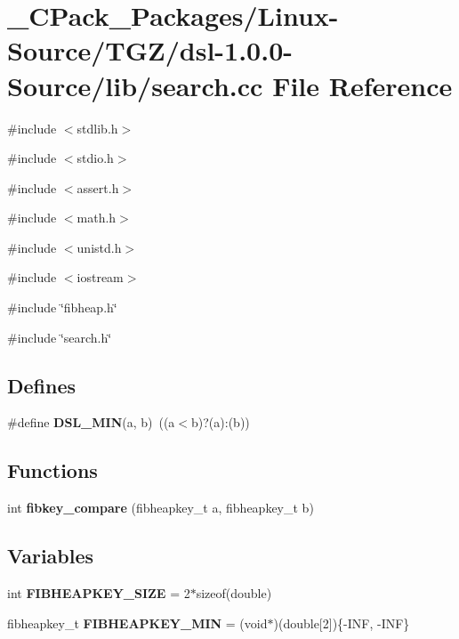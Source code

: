 \section{\_\-CPack\_\-Packages/Linux-\/Source/TGZ/dsl-\/1.0.0-\/Source/lib/search.cc File Reference}
\label{__CPack__Packages_2Linux-Source_2TGZ_2dsl-1_80_80-Source_2lib_2search_8cc}
{\ttfamily \#include $<$stdlib.h$>$}\par
{\ttfamily \#include $<$stdio.h$>$}\par
{\ttfamily \#include $<$assert.h$>$}\par
{\ttfamily \#include $<$math.h$>$}\par
{\ttfamily \#include $<$unistd.h$>$}\par
{\ttfamily \#include $<$iostream$>$}\par
{\ttfamily \#include \char`\"{}fibheap.h\char`\"{}}\par
{\ttfamily \#include \char`\"{}search.h\char`\"{}}\par
\subsection*{Defines}
\begin{DoxyCompactItemize}
\item 
\#define {\bf DSL\_\-MIN}(a, b)~((a$<$b)?(a):(b))
\end{DoxyCompactItemize}
\subsection*{Functions}
\begin{DoxyCompactItemize}
\item 
int {\bf fibkey\_\-compare} (fibheapkey\_\-t a, fibheapkey\_\-t b)
\end{DoxyCompactItemize}
\subsection*{Variables}
\begin{DoxyCompactItemize}
\item 
int {\bf FIBHEAPKEY\_\-SIZE} = 2$\ast$sizeof(double)
\item 
fibheapkey\_\-t {\bf FIBHEAPKEY\_\-MIN} = (void$\ast$)(double[2])\{-\/INF, -\/INF\}
\end{DoxyCompactItemize}


